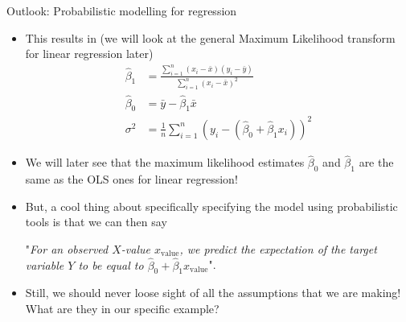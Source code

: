 \documentclass[a4,11pt]{beamer}
\newlength{\wideitemsep}
\let\olditem\item
\renewcommand{\item}{\setlength{\itemsep}{\wideitemsep}\olditem}
\begin{document}
\begin{frame}[allowframebreaks]{Outlook: Probabilistic modelling for regression}
\begin{itemize}
\item This results in (we will look at the general Maximum Likelihood transform for linear regression later) \begin{align*}
\hat{\beta}_1&=\frac{\sum_{i=1}^n\left(x_i-\bar{x}\right)\left(y_i-\bar{y}\right)}{\sum_{i=1}^n\left(x_i-\bar{x}\right)^2}\\
\hat{\beta}_0&=\bar{y}-\hat{\beta}_1\bar{x}\\
\sigma^2&=\frac{1}{n}\sum_{i=1}^n (y_i-(\hat{\beta}_0+\hat{\beta}_1x_i))^2
\end{align*}
\item We will later see that the maximum likelihood estimates $\hat{\beta}_0$ and $\hat{\beta}_1$ are the same as the OLS ones for linear regression!
\end{itemize}\pagebreak
\begin{itemize}
\item But, a cool thing about specifically specifying the model using probabilistic tools is that we can then say \begin{center}
	"\emph{For an observed $X$-value $x_{\text{value}}$, we predict the expectation of the target variable $Y$ to be equal to $\hat{\beta}_0+\hat{\beta}_1x_{\text{value}}$}".
\end{center}
	\item Still, we should never loose sight of all the assumptions that we are making! What are they in our specific example?
\end{itemize}
\end{frame}

\end{document}

